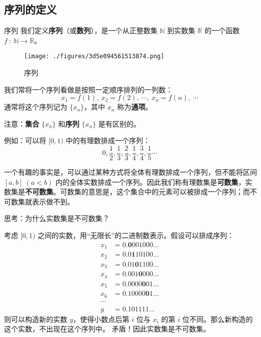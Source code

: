 
\begin{issues}
\issueTODO
\issueDraft
\end{issues}

\subsection{序列的定义}
\begin{definition}{序列}
我们定义\textbf{序列}（或\textbf{数列}），是一个从正整数集 $\mathbb{N}$  到实数集 $\mathbb{R}$ 的一个函数 $f\ :\ \mathbb{N}\rightarrow \mathbb{R}$。
\end{definition}
\begin{figure}[ht]
\centering
\texttt{[image: ./figures/3d5e094561513874.png]}
\caption{序列} \label{fig_seq_1}
\end{figure}
我们常将一个序列看做是按照一定顺序排列的一列数：
$$
x_1=f(1),\ x_2=f(2),\ \cdots,\ x_n=f(n),\ \cdots~
$$
通常将这个序列记为 $\{x_n\}$，其中 $x_n$ 称为\textbf{通项}。

注意：\textbf{集合} $\{x_n\}$ 和\textbf{序列} $\{x_n\}$ 是有区别的。

例如：可以将 $[0,1)$ 中的有理数排成一个序列：
$$
0,\frac{1}{2},\frac{1}{3},\frac{2}{3},\frac{1}{4},\frac{3}{4},\frac{1}{5}\cdots~
$$

一个有趣的事实是，可以通过某种方式将全体有理数排成一个序列，但不能将区间 $[a,b]\ (a<b)$ 内的全体实数排成一个序列。因此我们称有理数集是\textbf{可数集}，实数集是\textbf{不可数集}。可数集的意思是，这个集合中的元素可以被排成一个序列；而不可数集就表示做不到。

\begin{example}{}
思考：为什么实数集是不可数集？

考虑 $[0,1)$ 之间的实数，用“无限长”的二进制数表示。假设可以排成序列： 
\begin{equation}
\begin{aligned}
x_1&=0.\boldsymbol 0001000...\\
x_2&=0.0\boldsymbol 110100...\\
x_3&=0.01\boldsymbol 01100...\\
x_4&=0.001\boldsymbol 0000...\\
x_5&=0.0000\boldsymbol 001...\\
x_6&=0.10000\boldsymbol 01...\\
\cdots
\\
y&=0.101111...
\end{aligned}~
\end{equation}
则可以构造新的实数 $y$，使得小数点后第 $i$ 位与 $x_i$ 的第 $i$ 位不同。那么新构造的这个实数，不出现在这个序列中。
矛盾！因此实数集是不可数集。
\end{example}

​		

​		
